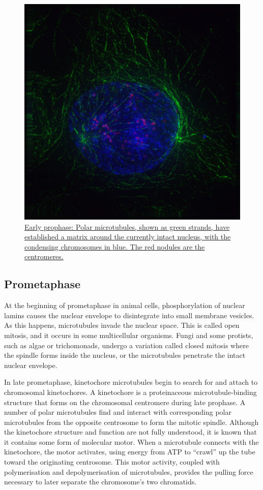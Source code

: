 \begin{figure}

{\centering \includegraphics[width=0.7\linewidth]{./figures/reproduction/ProphaseIF} 

}

\caption{\href{https://commons.wikimedia.org/wiki/File:ProphaseIF.jpg}{Early prophase: Polar microtubules, shown as green strands, have established a matrix around the currently intact nucleus, with the condensing chromosomes in blue. The red nodules are the centromeres.}}\label{fig:prophase}
\end{figure}

\hypertarget{prometaphase}{%
\subsection{Prometaphase}\label{prometaphase}}

At the beginning of prometaphase in animal cells, phosphorylation of nuclear lamins causes the nuclear envelope to disintegrate into small membrane vesicles. As this happens, microtubules invade the nuclear space. This is called open mitosis, and it occurs in some multicellular organisms. Fungi and some protists, such as algae or trichomonads, undergo a variation called closed mitosis where the spindle forms inside the nucleus, or the microtubules penetrate the intact nuclear envelope.

In late prometaphase, kinetochore microtubules begin to search for and attach to chromosomal kinetochores. A kinetochore is a proteinaceous microtubule-binding structure that forms on the chromosomal centromere during late prophase. A number of polar microtubules find and interact with corresponding polar microtubules from the opposite centrosome to form the mitotic spindle. Although the kinetochore structure and function are not fully understood, it is known that it contains some form of molecular motor. When a microtubule connects with the kinetochore, the motor activates, using energy from ATP to ``crawl'' up the tube toward the originating centrosome. This motor activity, coupled with polymerisation and depolymerisation of microtubules, provides the pulling force necessary to later separate the chromosome's two chromatids.



